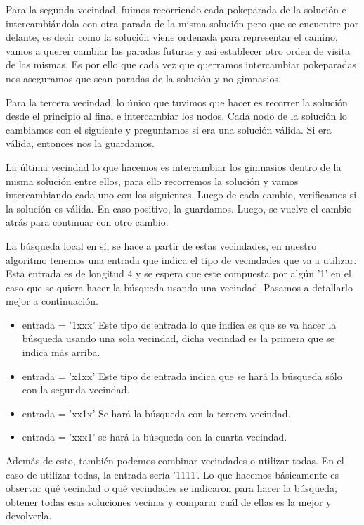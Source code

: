 Para la segunda vecindad, fuimos recorriendo cada pokeparada de la solución e intercambiándola con otra parada de la misma solución pero que se encuentre por delante, es decir como la solución viene ordenada para representar el camino, vamos a querer cambiar las paradas futuras y así establecer otro orden de visita de las mismas. Es por ello que cada vez que querramos intercambiar pokeparadas nos aseguramos que sean paradas de la solución y no gimnasios.

Para la tercera vecindad, lo único que tuvimos que hacer es recorrer la solución desde el principio al final e intercambiar los nodos. Cada nodo de la solución lo cambiamos con el siguiente y preguntamos si era una solución válida. Si era válida, entonces nos la guardamos.

La última vecindad lo que hacemos es intercambiar los gimnasios dentro de la misma solución entre ellos, para ello recorremos la solución y vamos intercambiando cada uno con los siguientes. Luego de cada cambio, verificamos si la solución es válida. En caso positivo, la guardamos. Luego, se vuelve el cambio atrás para continuar con otro cambio.


La búsqueda local en sí, se hace a partir de estas vecindades, en nuestro algoritmo tenemos una entrada que indica el tipo de vecindades que va a utilizar.
Esta entrada es de longitud 4 y se espera que este compuesta por algún '1' en el caso que se quiera hacer la búsqueda usando una vecindad. Pasamos a detallarlo mejor a continuación.
\begin{itemize}
\item entrada = '1xxx' Este tipo de entrada lo que indica es que se va hacer la búsqueda usando una sola vecindad, dicha vecindad es la primera que se indica más arriba.

\item entrada = 'x1xx' Este tipo de entrada indica que se hará la búsqueda sólo con la segunda vecindad.

\item entrada = 'xx1x' Se hará la búsqueda con la tercera vecindad.

\item entrada = 'xxx1' se hará la búsqueda con la cuarta vecindad.
\end{itemize}

Además de esto, también podemos combinar vecindades o utilizar todas. En el caso de utilizar todas, la entrada sería '1111'.
Lo que hacemos básicamente es observar qué vecindad o qué vecindades se indicaron para hacer la búsqueda, obtener todas esas soluciones vecinas y comparar cuál de ellas es la mejor y devolverla.

